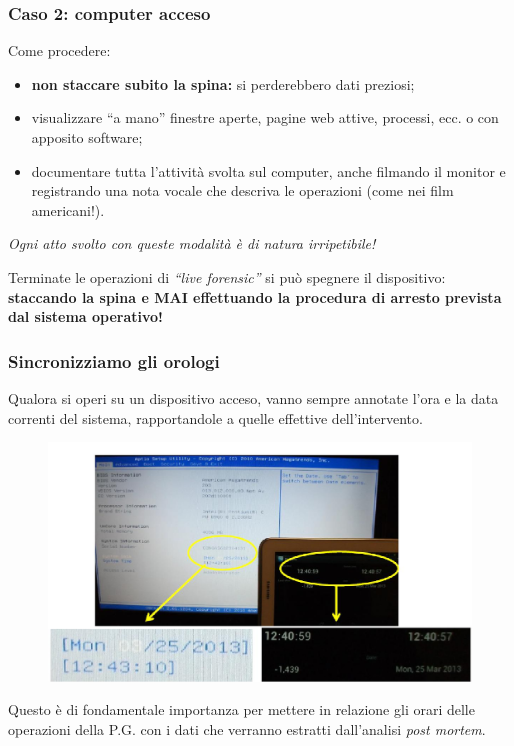 \documentclass[11pt]{beamer}
\begin{document}
	\begin{frame}
		\frametitle{Caso 2: computer acceso}

		Come procedere:
		\begin{itemize}
			\item \textbf{non staccare subito la spina:} si perderebbero dati preziosi;
			\item visualizzare ``a mano'' finestre aperte, pagine web attive, processi, ecc. o con apposito software;
			\item documentare tutta l'attività svolta sul computer, anche filmando il monitor e registrando una nota vocale che descriva le operazioni (come nei film americani!). 
			
		\end{itemize}
		\vfill
		\textit{Ogni atto svolto con queste modalità è di natura irripetibile!}

		\vfill
		Terminate le operazioni di \textit{``live forensic''} si può spegnere il dispositivo: \textbf{staccando la spina e MAI effettuando la procedura di arresto prevista dal sistema operativo!}
	\end{frame}
	
	\begin{frame}
		\frametitle{Sincronizziamo gli orologi}
		Qualora si operi su un dispositivo acceso, vanno sempre annotate l'ora e la data correnti del sistema, rapportandole a quelle effettive dell'intervento.
		\begin{figure}
			\centering
			\includegraphics[width=0.6\linewidth]{pics/dataora}
			\label{fig:dataora}
		\end{figure}
		Questo è di fondamentale importanza per mettere in relazione gli orari delle operazioni della P.G. con i dati che verranno estratti dall'analisi \textit{post mortem}.
	\end{frame}
	
\end{document}
